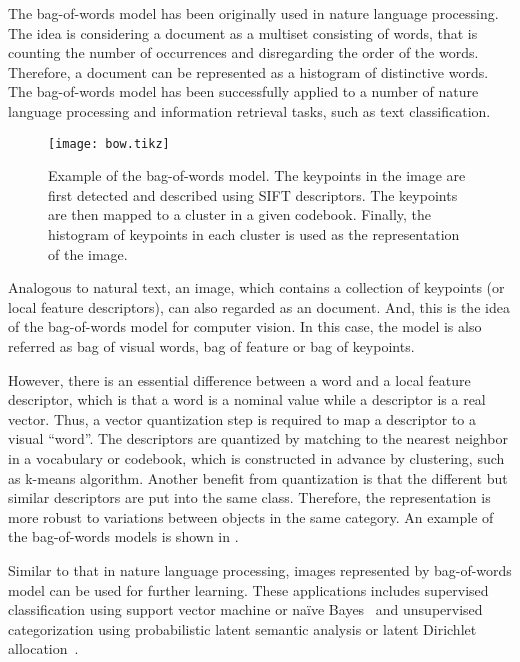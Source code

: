 \documentclass[12pt,final,twoside]{report}
\begin{document}
The bag-of-words model has been originally used in nature language processing. The idea is considering a document as a multiset consisting of words, that is counting the number of occurrences and disregarding the order of the words. Therefore, a document can be represented as a histogram of distinctive words. The bag-of-words model has been successfully applied to a number of nature language processing and information retrieval tasks, such as text classification.

\begin{figure}[t]
  \centering
  \texttt{[image: bow.tikz]}
  \caption[Example of the bag-of-words model.]{Example of the bag-of-words model. The keypoints in the image are first detected and described using SIFT descriptors. The keypoints are then mapped to a cluster in a given codebook. Finally, the histogram of keypoints in each cluster is used as the representation of the image.}
  \label{fig:bow}
\end{figure}

Analogous to natural text, an image, which contains a collection of keypoints (or local feature descriptors), can also regarded as an document. And, this is the idea of the bag-of-words model for computer vision. In this case, the model is also referred as bag of visual words, bag of feature or bag of keypoints. 

However, there is an essential difference between a word and a local feature descriptor, which is that a word is a nominal value while a descriptor is a real vector. Thus, a vector quantization step is required to map a descriptor to a visual ``word''. The descriptors are quantized by matching to the nearest neighbor in a vocabulary or codebook, which is constructed in advance by clustering, such as k-means algorithm. Another benefit from quantization is that the different but similar descriptors are put into the same class. Therefore, the representation is more robust to variations between objects in the same category. An example of the bag-of-words models is shown in .

Similar to that in nature language processing, images represented by bag-of-words model can be used for further learning. These applications includes supervised classification using support vector machine or na\"ive Bayes~\cite{csurka_visual_2004} and unsupervised categorization using probabilistic latent semantic analysis or latent Dirichlet allocation~\cite{sivic_discovering_2005}.
\end{document}
